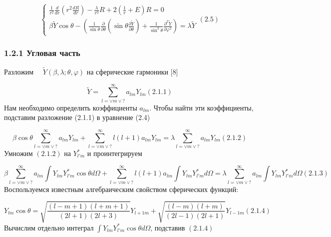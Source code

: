 \documentclass[a4paper]{article}
\begin{document}
\begin{equation*}
\left\{\begin{matrix}\frac 1{r^2}\frac d{\mathit{dr}}\left(r^2\frac{dR}{\mathit{dr}}\right)-\frac{\lambda
}{r^2}R+2\left(\frac 1 r+E\right)R=0\\\beta \widetilde Y\cos \theta -\left(\frac 1{\sin \theta
}\frac{{\partial}}{{\partial}\theta }\left(\sin \theta \frac{{\partial}\widetilde Y}{{\partial}\theta }\right)+\frac
1{\sin ^2\theta }\frac{{\partial}^2\widetilde Y}{{\partial}\varphi ^2}\right)=\lambda \widetilde
Y\end{matrix}\right.(2.5)
\end{equation*}
\subsubsection[1.2.1 Угловая часть]{1.2.1
Угловая часть}
\hypertarget{RefHeading4675463868395}{}Разложим \ \  $\widetilde
Y(\beta ,\lambda ;\theta ,\varphi )$ на
сферические гармоники [8]

\begin{equation*}
\widetilde Y=\sum _{l=\vee m\vee ?}^{{\infty}}a_{\mathit{lm}}Y_{\mathit{lm}}(2.1.1)
\end{equation*}
Нам необходимо определить
коэффициенты  $a_{\mathit{lm}}$.
Чтобы найти эти коэффициенты, подставим разложение (2.1.1) в уравнение (2.4)

\begin{equation*}
\beta \cos \theta \sum _{l=\vee m\vee ?}^{{\infty}}a_{\mathit{lm}}Y_{\mathit{lm}}+\sum _{l=\vee m\vee
?}^{{\infty}}l(l+1)a_{\mathit{lm}}Y_{\mathit{lm}}=\lambda \sum _{l=\vee m\vee
?}^{{\infty}}a_{\mathit{lm}}Y_{\mathit{lm}}(2.1.2)
\end{equation*}
Умножим  $(2.1.2)$ на  $Y_{l'm}^{\ast }$ и
проинтегрируем

\begin{equation*}
\beta \sum _{l=\vee m\vee ?}^{{\infty}}a_{\mathit{lm}}\int Y_{\mathit{lm}}Y_{l'm}^{\ast }\cos \theta \mathit{d\Omega
}+\sum _{l=\vee m\vee ?}^{{\infty}}l(l+1)a_{\mathit{lm}}\int Y_{\mathit{lm}}Y_{l'm}^{\ast }\mathit{d\Omega }=\lambda
\sum _{l=\vee m\vee ?}^{{\infty}}a_{\mathit{lm}}\int Y_{\mathit{lm}}Y_{l'm}^{\ast }\mathit{d\Omega }(2.1.3)
\end{equation*}
Воспользуемся известным алгебраическим свойством сферических функций:

\begin{equation*}
Y_{\mathit{lm}}\cos \theta
=\sqrt{\frac{(l-m+1)(l+m+1)}{\left(2l+1\right)(2l+3)}}Y_{l+1m}+\sqrt{\frac{(l-m)(l+m)}{\left(2l-1\right)(2l+1)}}Y_{l-1m}(2.1.4)
\end{equation*}
Вычислим отдельно
интеграл  $\int Y_{\mathit{lm}}Y_{l'm}^{\ast }\cos \theta
\mathit{d\Omega }$, подставив  $(2.1.4)$ 
\end{document}

